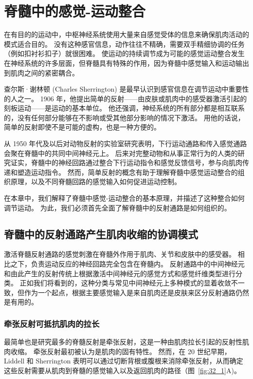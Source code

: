 \chapter{脊髓中的感觉-运动整合} \label{chap:chap32}

在有目的的运动中，中枢神经系统使用大量来自感觉受体的信息来确保肌肉活动的模式适合目的。
没有这种感官信息，动作往往不精确，需要双手精细协调的任务（例如扣衬衫扣子）就很困难。
使运动的持续调节成为可能的感觉运动整合发生在神经系统的许多层面，但脊髓具有特殊的作用，因为脊髓中感觉输入和运动输出到肌肉之间的紧密耦合。


查尔斯·谢林顿 (Charles Sherrington) 是最早认识到感官信息在调节运动中重要性的人之一。
1906 年，他提出简单的反射——由皮肤或肌肉中的感受器激活引起的刻板运动——是运动的基本单位。
他还强调，神经系统的所有部分都是相互联系的，没有任何部分能够在不影响或受其他部分影响的情况下激活。
用他的话说，简单的反射即使不是可能的虚构，也是一种方便的。


从 1950 年代及以后对动物反射的实验室研究表明，下行运动通路和传入感觉通路会聚在脊髓中的共同中间神经元上。
后来对完整动物和从事正常行为的人类的研究证实，脊髓中的神经回路通过整合下行运动指令和感觉反馈信号，参与向肌肉传递和塑造运动指令。
然而，简单反射的概念有助于理解脊髓中感觉运动整合的组织原理，以及不同脊髓回路的感觉输入如何促进运动控制。


在本章中，我们解释了脊髓中感觉-运动整合的基本原理，并描述了这种整合如何调节运动。
为此，我们必须首先全面了解脊髓中的反射通路是如何组织的。



\section{脊髓中的反射通路产生肌肉收缩的协调模式}

激活脊髓反射通路的感觉刺激在脊髓外作用于肌肉、关节和皮肤中的感受器。
相比之下，负责运动反应的神经回路完全包含在脊髓内。 
反射通路中的中间神经元和由此产生的反射传统上根据激活中间神经元的感觉方式和感觉纤维类型进行分类。
正如我们将看到的，这种分类与常见中间神经元上多种模式的显着收敛不一致，但作为一个起点，根据主要感觉输入是来自肌肉还是皮肤来区分反射通路仍然是有用的。



\subsection{牵张反射可抵抗肌肉的拉长}

最简单也是研究最多的脊髓反射是牵张反射，这是一种由肌肉拉长引起的反射性肌肉收缩。
牵张反射最初被认为是肌肉的固有特性。
然而，在 20 世纪早期，Liddell 和 Sherrington 表明可以通过切断背根或腹根来消除牵张反射，从而确定这些反射需要从肌肉到脊髓的感觉输入以及返回肌肉的路径（图~\ref{fig:32_1}A)。


